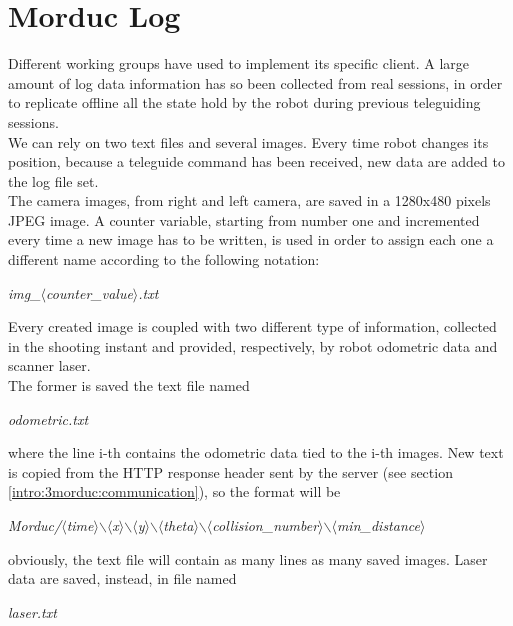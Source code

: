 \section{Morduc Log}
\label{log:morduc}

Different working groups have used \morduc{} to implement its
specific client. A large amount of log data
information has so been collected from real sessions, in
order to replicate offline all the state hold by the robot
during previous teleguiding sessions.
\\
We can rely on two text files and several images. Every time
robot changes its position, because a teleguide command has
been received, new data are added to the log file set.
\\
The camera images, from right and left camera, are saved in 
a 1280x480 pixels JPEG image. A counter variable,
starting from number one and incremented every time a new image
has to be written, is used in order to assign each one a different
name according to the following notation:

\begin{center}
  \textit{img\_$\langle$counter\_value$\rangle$.txt}
\end{center}

Every created image is coupled with two different type of
information, collected in the shooting instant and provided,
respectively, by robot odometric data and scanner laser.
\\
The former is saved the text file named

\begin{center}
  \textit{odometric.txt}
\end{center}

where the line i-th contains the odometric data tied to the i-th
images. New text is copied from the HTTP response header sent
by the \morduc{} server (see section \ref{intro:3morduc:communication}),
so the format will be

\begin{center}
  \textit{Morduc/$\langle$time$\rangle$$\backslash$$\langle$x$\rangle$$\backslash$$\langle$y$\rangle$$\backslash$$\langle$theta$\rangle$$\backslash$$\langle$collision\_number$\rangle$$\backslash$$\langle$min\_distance$\rangle$}
\end{center}

obviously, the text file will contain as many lines as many
saved images.
Laser data are saved, instead, in file named

\begin{center}
  \textit{laser.txt}
\end{center}

